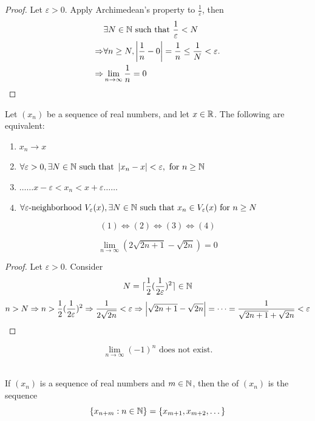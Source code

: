 \documentclass[a4paper,12pt]{article}
\begin{document}
\begin{proof}
    Let \(\varepsilon>0\). Apply Archimedean's property to \(\frac{1}{\varepsilon}\), then
    \begin{align*}
        & \exists N\in \mathbb{N} \text{ such that }\frac{1}{\varepsilon}<N \\
        \Rightarrow & \forall n \ge N, \left\lvert \frac{1}{n}-0\right\rvert = \frac{1}{n}\le \frac{1}{N} < \varepsilon.\\
        \Rightarrow & \lim_{n \to \infty}\frac{1}{n} = 0
    \end{align*}
\end{proof}
\newpage
\begin{theorem}
    Let \((x_n)\) be a sequence of real numbers, and let \(x \in \mathbb{R}\). The following are equivalent:
\begin{enumerate}
    \item \(x_n \rightarrow x\)
    \item \(\forall \varepsilon > 0, \exists N \in \mathbb{N} \text{ such that } \left\lvert x_n-x\right\rvert<\varepsilon,\text{ for }n\ge \mathbb{N} \)
    \item \(\dots \dots x - \varepsilon<x_n<x+\varepsilon\dots\dots\)
    \item \(\forall\varepsilon\text{-neighborhood } V_\varepsilon(x),\exists N \in \mathbb{N} \text{ such that } x_n \in V_\varepsilon(x) \text{ for } n\ge N\)\\
\end{enumerate}
\[(1)\Leftrightarrow(2)\Leftrightarrow(3)\Leftrightarrow(4)\]
\end{theorem}

\begin{proposition}
    \[\lim_{n\to \infty}(2\sqrt{2n+1}-\sqrt{2n})=0\]
\end{proposition}

\begin{proof}
    Let \(\varepsilon > 0\). Consider \[N = \lceil\frac{1}{2}(\frac{1}{2\varepsilon})^2\rceil\in\mathbb{N}\]
    \[n>N\Rightarrow n>\frac{1}{2}(\frac{1}{2\varepsilon})^2 \Rightarrow \frac{1}{2\sqrt{2n}}<\varepsilon\Rightarrow\left\lvert \sqrt{2n+1}-\sqrt{2n}\right\rvert = \dots = \frac{1}{\sqrt{2n+1}+\sqrt{2n}}<\varepsilon\]
\end{proof}

\begin{remark}
    \[\lim_{n\to\infty}(-1)^n\text{ does not exist.}\]\\
\end{remark}

\begin{definition}
    If \((x_n)\) is a sequence of real numbers and \(m \in \mathbb{N}\), then the  of \((x_n)\) is the sequence 
    \[\{x_{n+m}:n\in\mathbb{N}\}=\{x_{m+1}, x_{m+2}, \dots\}\]
\end{definition}
\end{document}
